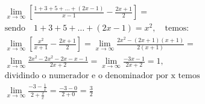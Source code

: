 \begin{ex}
\begin{align}
&\lim_{x\rightarrow \infty} \left[\frac{1+3+5+\dots+(2x-1)}{x-1}-\frac{2x+1}{2}\right]=\nonumber\\
&\text{sendo}\quad 1+3+5+\dots+(2x-1)=x^2,\quad\text{temos:}\nonumber\\
&\lim_{x\rightarrow \infty} \left[\frac{x^2}{x+1}-\frac{2x+1}{2}\right]=\lim_{x\rightarrow \infty} \frac{2x^2-(2x+1)(x+1)}{2(x+1)}=\nonumber\\
&\lim_{x\rightarrow \infty} \frac{2x^2-2x^2-2x-x-1}{2x+2}=\lim_{x\rightarrow \infty} \frac{-3x-1}{2x+2}=1,\nonumber\\
&\text{dividindo o numerador e o denominador por x temos}\nonumber\\
&\lim_{x\rightarrow \infty} \frac{-3-\frac{1}{x}}{2+\frac{2}{x}}=\frac{-3-0}{2+0}=\frac{3}{2}\nonumber
\end{align}
\end{ex}
